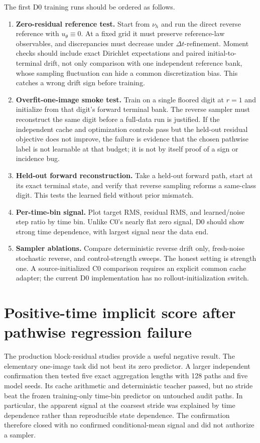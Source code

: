\documentclass[11pt]{article}
\numberwithin{equation}{section}
\newcommand{\1}{\mathbf 1}
\begin{document}
The first D0 training runs should be ordered as follows.
\begin{enumerate}[leftmargin=2.0em]
  \item \textbf{Zero-residual reference test.}  Start from \(\nu_h\) and run the direct reverse reference with \(u_\theta\equiv0\).  At a fixed grid it must preserve reference-law observables, and discrepancies must decrease under \(\Delta t\)-refinement.  Moment checks should include exact Dirichlet expectations and paired initial-to-terminal drift, not only comparison with one independent reference bank, whose sampling fluctuation can hide a common discretization bias.  This catches a wrong drift sign before training.
  \item \textbf{Overfit-one-image smoke test.}  Train on a single floored digit at \(r=1\) and initialize from that digit's forward terminal bank.  The reverse sampler must reconstruct the same digit before a full-data run is justified.  If the independent cache and optimization controls pass but the held-out residual objective does not improve, the failure is evidence that the chosen pathwise label is not learnable at that budget; it is not by itself proof of a sign or incidence bug.
  \item \textbf{Held-out forward reconstruction.}  Take a held-out forward path, start at its exact terminal state, and verify that reverse sampling reforms a same-class digit.  This tests the learned field without prior mismatch.
  \item \textbf{Per-time-bin signal.}  Plot target RMS, residual RMS, and learned/noise step ratio by time bin.  Unlike C0's nearly flat zero signal, D0 should show strong time dependence, with largest signal near the data end.
  \item \textbf{Sampler ablations.}  Compare deterministic reverse drift only, fresh-noise stochastic reverse, and control-strength sweeps.  The honest setting is strength one.  A source-initialized C0 comparison requires an explicit common cache adapter; the current D0 implementation has no rollout-initialization switch.
\end{enumerate}

\section{Positive-time implicit score after pathwise regression failure}
\label{sec:implicit-score}

The production block-residual studies provide a useful negative result.  The
elementary one-image task did not beat its zero predictor.  A larger independent
confirmation then tested five exact aggregation lengths with 128 paths and five
model seeds.  Its cache arithmetic and deterministic teacher passed, but no
stride beat the frozen training-only time-bin predictor on untouched audit
paths.  In particular, the apparent signal at the coarsest stride was explained
by time dependence rather than reproducible state dependence.  The confirmation
therefore closed with no confirmed conditional-mean signal and did not authorize
a sampler.
\end{document}
